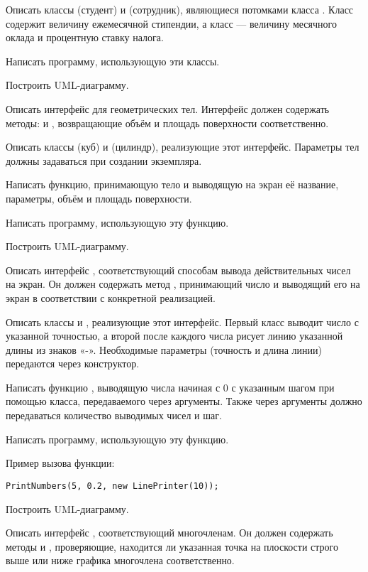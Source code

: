 Описать классы  (студент) и  (сотрудник),
являющиеся потомками класса . Класс  содержит
величину ежемесячной стипендии, а класс  — величину
месячного оклада и процентную ставку налога.

Написать программу, использующую эти классы.

Построить UML-диаграмму.

\task Описать интерфейс  для геометрических тел. Интерфейс
должен содержать методы:  и ,
возвращающие объём и площадь поверхности соответственно.

Описать классы  (куб) и  (цилиндр),
реализующие этот интерфейс. Параметры тел должны задаваться при
создании экземпляра.

Написать функцию, принимающую тело и выводящую на экран её название,
параметры, объём и площадь поверхности.

Написать программу, использующую эту функцию.

Построить UML-диаграмму.

\task Описать интерфейс , соответствующий способам
вывода действительных чисел на экран. Он должен содержать метод
, принимающий число и выводящий его на экран в соответствии
с конкретной реализацией.

Описать классы  и , реализующие
этот интерфейс. Первый класс выводит число с указанной точностью, а
второй после каждого числа рисует линию указанной длины из знаков
«-». Необходимые параметры (точность и длина линии) передаются через
конструктор.

Написать функцию , выводящую числа начиная с 0 с
указанным шагом при помощью класса, передаваемого через
аргументы. Также через аргументы должно передаваться количество
выводимых чисел и шаг.

Написать программу, использующую эту функцию.

Пример вызова функции:
\begin{lstlisting}[numbers=none]
PrintNumbers(5, 0.2, new LinePrinter(10));
\end{lstlisting}

Построить UML-диаграмму.

\task Описать интерфейс , соответствующий
многочленам. Он должен содержать методы  и ,
проверяющие, находится ли указанная точка на плоскости строго выше или
ниже графика многочлена соответственно.

